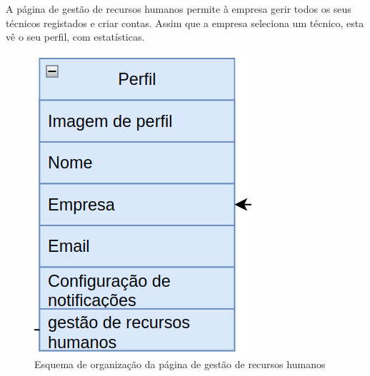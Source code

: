 A página de gestão de recursos humanos permite à empresa gerir todos os seus técnicos registados e criar contas. Assim que a empresa seleciona um técnico, esta vê o seu perfil, 
com estatísticas.
\begin{figure}[htb]
    \centering
    
    \includegraphics[height=0.35\textwidth]{images/Arquiteturas/superficial_de_app/perfil.png}
    \caption{Esquema de organização da página de gestão de recursos humanos}
    \label{fig:11}
\end{figure}